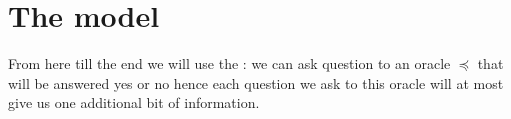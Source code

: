 \section{The model}
\label{tree:sorting:model}

From here till the end we will use the  : we can ask question to an oracle $\preceq$ that will be answered yes or no hence each question we ask to this oracle will at most give us one additional bit of information.
